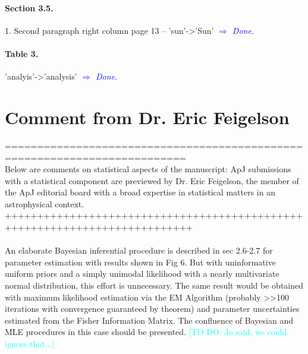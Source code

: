 \documentclass[10pt,a4paper]{article}
\newcommand{\HW}[1]{\textcolor{Cyan}{#1}}
\newcommand{\Comment}[1]{\textsl{\textcolor{Blue}{$\Longrightarrow$ {#1}}}}
\begin{document}
\paragraph{Section 3.5.} 1. Second paragraph right column page 13 -- 'sun'->'Sun' \Comment{Done.}

\paragraph{Table 3.} 'analyis'->'analysis'  \Comment{Done.}

\section{Comment from Dr. Eric Feigelson}


==========================================================================\\
Below are comments on statistical aspects of the manuscript: ApJ submissions with a
statistical component are previewed by Dr. Eric Feigelson, the member of the ApJ
editorial board with a broad expertise in statistical matters in an astrophysical
context.\\
+++++++++++++++++++++++++++++++++++++++++++++++++++++++++++++++++++++++++++\\\\

An elaborate Bayesian inferential procedure is described in sec 2.6-2.7 for
parameter estimation with results shown in Fig 6. But with uninformative uniform
priors and a simply unimodal likelihood with a nearly multivariate normal
distribution, this effort is unnecessary. The same result would be obtained with
maximum likelihood estimation via the EM Algorithm (probably >>100 iterations with
convergence guaranteed by theorem) and parameter uncertainties estimated from the
Fisher Information Matrix. The confluence of Bayesian and MLE procedures in this
case should be presented. \HW{[TO DO: Jo said, we could ignore that...]}
\end{document}
